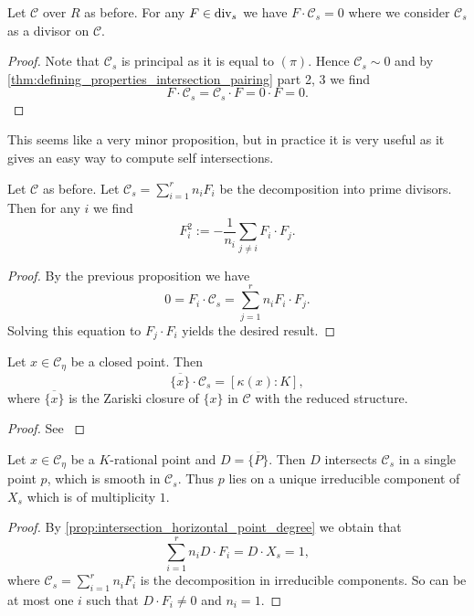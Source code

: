 \begin{proposition}
	Let $\mathscr C$ over $R$ as before. 
	For any $F \in \operatorname{div}_s$ we have $F\cdot \mathscr C_s = 0$ where we consider $\mathscr C_s$ as a divisor on $\mathscr C$. 
\end{proposition}
\begin{proof}
	Note that $\mathscr C_s$ is principal as it is equal to $(\pi)$. 
	Hence $\mathscr C_s \sim 0$ and by \cref{thm:defining_properties_intersection_pairing} part 2, 3 we find \[
	F\cdot \mathscr C_s = \mathscr C_s \cdot F = 0 \cdot F = 0
	.\] 
\end{proof}
This seems like a very minor proposition, but in practice it is very useful as it gives an easy way to compute self intersections. 
\begin{corollary}\label{cor:compute_self_intersection}
	Let $\mathscr C$ as before. 
	Let $\mathscr C_s = \sum_{i =1}^{r} n_i F_i$ be the decomposition into prime divisors. 
	Then for any $i$ we find \[
		F^2_i := -\frac{1}{n_i} \sum_{j \ne i} F_i \cdot F_j
	.\] 
\end{corollary}
\begin{proof}
	By the previous proposition we have \[
	 0 = F_i \cdot \mathscr C_s = \sum_{j = 1}^{r} n_i F_i \cdot F_j
	.\] 
	Solving this equation to $F_j \cdot F_i$ yields the desired result. 
\end{proof}

\begin{proposition}\label{prop:intersection_horizontal_point_degree}
	Let $x \in \mathscr C_\eta$ be a closed point. 
	Then \[
		\overline{\{x\} }\cdot \mathscr C_s = [\kappa(x): K]
	,\] 
	where $\overline{\{x\} }$ is the Zariski closure of $\{x\} $ in $\mathscr C$ with the reduced structure. 
\end{proposition}
\begin{proof}
	See \cite[prop.\ 9.1.30]{liuAlgebraicGeometryArithmetic2002}
\end{proof}


\begin{corollary}\label{cor:closure_K_rational_point}
	Let $x \in \mathscr C_\eta$ be a $K$-rational point and $D = \overline{\{P\} } $. 
	Then $D$ intersects $\mathscr C_s$ in a single point $p$, which is smooth in $\mathscr C_s$. 
	Thus $p$ lies on a unique irreducible component of $X_s$ which is of multiplicity $1$. 
\end{corollary}
\begin{proof}
	By \cref{prop:intersection_horizontal_point_degree} we obtain that \[
	\sum_{i = 1}^{r}  n_i D\cdot F_i = D \cdot X_s = 1
	,\] 
	where $\mathscr C_s = \sum_{i =1}^{r} n_i F_i$ is the decomposition in irreducible components. 
	So can be at most one $i$ such that $D\cdot F_i \ne  0$ and $n_i = 1$. 
\end{proof}

